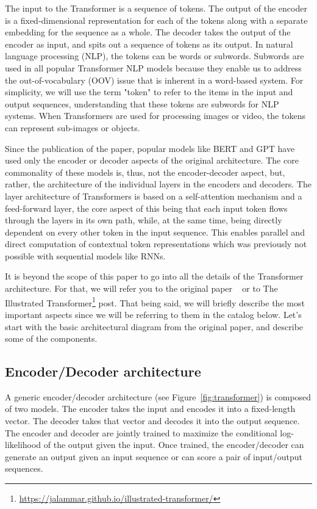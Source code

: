\documentclass{article}
\begin{document}
The input to the Transformer is a sequence of tokens. The output of the encoder is a fixed-dimensional representation for each of the tokens along with a separate embedding for the sequence as a whole. The decoder takes the output of the encoder as input, and spits out a sequence of tokens as its output. In natural language processing (NLP), the tokens can be words or subwords. Subwords are used in all popular Transformer NLP models because they enable us to address the out-of-vocabulary (OOV) issue that is inherent in a word-based system. For simplicity, we will use the term "token" to refer to the items in the input and output sequences, understanding that these tokens are subwords for NLP systems. When Transformers are used for processing images or video, the tokens can represent sub-images or objects.

Since the publication of the paper, popular models like BERT and GPT have used only the encoder or decoder aspects of the original architecture. The core commonality of these models is, thus, not the encoder-decoder aspect, but, rather, the architecture of the individual layers in the encoders and decoders. The layer architecture of Transformers is based on a self-attention mechanism and a feed-forward layer, the core aspect of this being that each input token flows through the layers in its own path, while, at the same time, being directly dependent on every other token in the input sequence. This enables parallel and direct computation of contextual token representations which was previously not possible with sequential models like RNNs.

It is beyond the scope of this paper to go into all the details of the Transformer architecture. For that, we will refer you to the original paper \protect~ or to The Illustrated Transformer\footnote{\url{https://jalammar.github.io/illustrated-transformer/}} post. That being said, we will briefly describe the most important aspects since we will be referring to them in the catalog below. Let’s start with the basic architectural diagram from the original paper, and describe some of the components.

\subsection{Encoder/Decoder architecture}

A generic encoder/decoder architecture (see Figure~\ref{fig:transformer}) is composed of two models. The encoder takes the input and encodes it into a fixed-length vector. The decoder takes that vector and decodes it into the output sequence. The encoder and decoder are jointly trained to 
maximize the conditional log-likelihood
of the output given the input. 
Once trained, the encoder/decoder can generate an output given an input sequence or can score a pair of input/output sequences.
\end{document}
